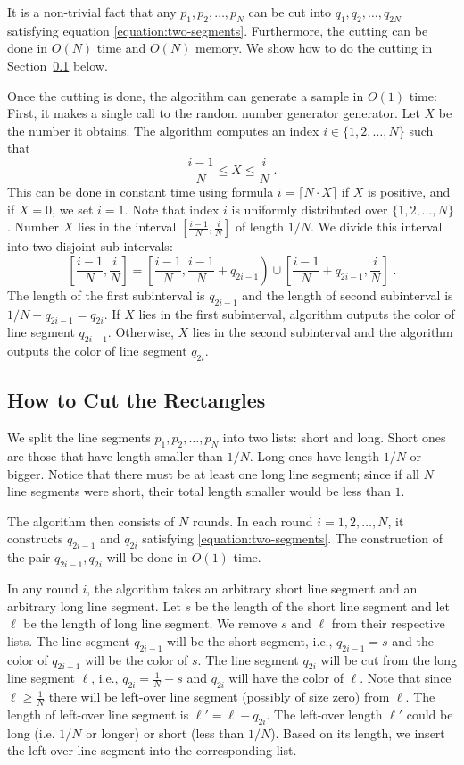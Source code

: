 \documentclass{article}
\begin{document}
It is a non-trivial fact that any $p_1, p_2, \dots, p_N$ can be cut into $q_1,
q_2, \dots, q_{2N}$ satisfying equation \eqref{equation:two-segments}.
Furthermore, the cutting can be done in $O(N)$ time and $O(N)$ memory. We show
how to do the cutting in Section~\ref{subsection:cutting} below.

Once the cutting is done, the algorithm can generate a sample in $O(1)$ time:
First, it makes a single call to the random number generator generator. Let $X$
be the number it obtains. The algorithm computes an index $i \in \{1,2,\dots,N\}$
such that
$$
\frac{i-1}{N} \le X \le \frac{i}{N} \; .
$$
This can be done in constant time using formula $i = \lceil N \cdot X \rceil$
if $X$ is positive, and if $X = 0$, we set $i=1$.  Note that index $i$ is
uniformly distributed over $\{1,2,\dots,N\}$.  Number $X$ lies in the interval
$[\frac{i-1}{N}, \frac{i}{N}]$ of length $1/N$. We divide this interval into
two disjoint sub-intervals:
$$
\left[\frac{i-1}{N}, \frac{i}{N} \right]
=
\left[\frac{i-1}{N}, \frac{i-1}{N} + q_{2i-1} \right)
\cup
\left[\frac{i-1}{N} + q_{2i-1}, \frac{i}{N} \right] \; .
$$
The length of the first subinterval is $q_{2i-1}$ and the length of second
subinterval is $1/N - q_{2i - 1} = q_{2i}$. If $X$ lies in the first
subinterval, algorithm outputs the color of line segment $q_{2i-1}$. Otherwise,
$X$ lies in the second subinterval and the algorithm outputs the color of
line segment $q_{2i}$.

\subsection{How to Cut the Rectangles}
\label{subsection:cutting}

We split the line segments $p_1, p_2, \dots, p_N$ into two lists: short and
long. Short ones are those that have length smaller than $1/N$. Long ones have
length $1/N$ or bigger. Notice that there must be at least one long line
segment; since if all $N$ line segments were short, their total length smaller
would be less than $1$.

The algorithm then consists of $N$ rounds. In each round $i=1,2,\dots,N$, it
constructs $q_{2i-1}$ and $q_{2i}$ satisfying \eqref{equation:two-segments}.
The construction of the pair $q_{2i-1}, q_{2i}$ will be done in $O(1)$ time.

In any round $i$, the algorithm takes an arbitrary short line segment and an
arbitrary long line segment. Let $s$ be the length of the short line segment
and let $\ell$ be the length of long line segment. We remove $s$ and $\ell$
from their respective lists. The line segment $q_{2i-1}$ will be the short
segment, i.e., $q_{2i-1} = s$ and the color of $q_{2i-1}$ will be the color of
$s$.  The line segment $q_{2i}$ will be cut from the long line segment $\ell$,
i.e., $q_{2i} = \frac{1}{N} - s$ and $q_{2i}$ will have the color of $\ell$.
Note that since $\ell \ge \frac{1}{N}$ there will be left-over line segment
(possibly of size zero) from $\ell$. The length of left-over line segment is
$\ell' = \ell - q_{2i}$. The left-over length $\ell'$ could be long (i.e. $1/N$
or longer) or short (less than $1/N$). Based on its length, we insert the
left-over line segment into the corresponding list.
\end{document}
